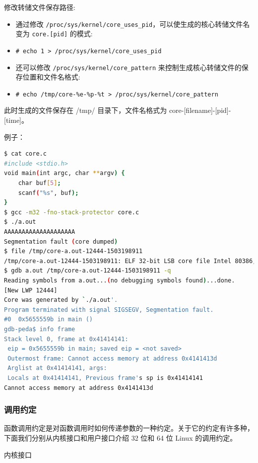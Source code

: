 \indent 
\indent 修改转储文件保存路径:
\begin{itemize}
    \item 通过修改 \verb+/proc/sys/kernel/core_uses_pid+，可以使生成的核心转储文件名变为 \verb+core.[pid]+ 的模式:
    \item \verb+# echo 1 > /proc/sys/kernel/core_uses_pid+
    \item 还可以修改 \verb+/proc/sys/kernel/core_pattern+ 来控制生成核心转储文件的保存位置和文件名格式:
    \item \verb+# echo /tmp/core-%e-%p-%t > /proc/sys/kernel/core_pattern+
\end{itemize}

\indent 此时生成的文件保存在 /tmp/ 目录下，文件名格式为 core-[filename]-[pid]-[time]。

\indent 例子：
\begin{lstlisting}[language=bash, style=customStyleBashDark, caption=内存转储示例]
$ cat core.c
#include <stdio.h>
void main(int argc, char **argv) {
    char buf[5];
    scanf("%s", buf);
}
$ gcc -m32 -fno-stack-protector core.c
$ ./a.out
AAAAAAAAAAAAAAAAAAAA
Segmentation fault (core dumped)
$ file /tmp/core-a.out-12444-1503198911
/tmp/core-a.out-12444-1503198911: ELF 32-bit LSB core file Intel 80386, version 1 (SYSV), SVR4-style, from './a.out', real uid: 1000, effective uid: 1000, real gid: 1000, effective gid: 1000, execfn: './a.out', platform: 'i686'
$ gdb a.out /tmp/core-a.out-12444-1503198911 -q
Reading symbols from a.out...(no debugging symbols found)...done.
[New LWP 12444]
Core was generated by `./a.out'.
Program terminated with signal SIGSEGV, Segmentation fault.
#0  0x5655559b in main ()
gdb-peda$ info frame
Stack level 0, frame at 0x41414141:
 eip = 0x5655559b in main; saved eip = <not saved>
 Outermost frame: Cannot access memory at address 0x4141413d
 Arglist at 0x41414141, args:
 Locals at 0x41414141, Previous frame's sp is 0x41414141
Cannot access memory at address 0x4141413d
\end{lstlisting}

\subsubsection{调用约定}
\indent \setlength{\parindent}{2em}

\indent 函数调用约定是对函数调用时如何传递参数的一种约定。关于它的约定有许多种，下面我们分别从内核接口和用户接口介绍 32 位和 64 位 Linux 的调用约定。

\indent 内核接口

